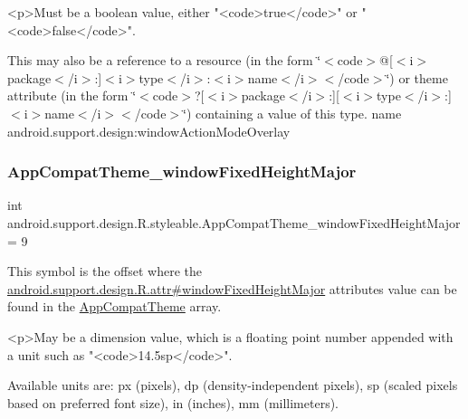 \begin{DoxyVerb}      <p>Must be a boolean value, either "<code>true</code>" or "<code>false</code>".
\end{DoxyVerb}
 

This may also be a reference to a resource (in the form \char`\"{}$<$code$>$@\mbox{[}$<$i$>$package$<$/i$>$\+:\mbox{]}$<$i$>$type$<$/i$>$\+:$<$i$>$name$<$/i$>$$<$/code$>$\char`\"{}) or theme attribute (in the form \char`\"{}$<$code$>$?\mbox{[}$<$i$>$package$<$/i$>$\+:\mbox{]}\mbox{[}$<$i$>$type$<$/i$>$\+:\mbox{]}$<$i$>$name$<$/i$>$$<$/code$>$\char`\"{}) containing a value of this type.  name android.\+support.\+design\+:window\+Action\+Mode\+Overlay \mbox{\label{classandroid_1_1support_1_1design_1_1R_1_1styleable_adda8a0798f30bcf0b35dc5ca9c4e570a}} 
\subsubsection{\texorpdfstring{App\+Compat\+Theme\+\_\+window\+Fixed\+Height\+Major}{AppCompatTheme\_windowFixedHeightMajor}}
{\footnotesize\ttfamily int android.\+support.\+design.\+R.\+styleable.\+App\+Compat\+Theme\+\_\+window\+Fixed\+Height\+Major = 9\hspace{0.3cm}{\ttfamily [static]}}

This symbol is the offset where the \hyperlink{classandroid_1_1support_1_1design_1_1R_1_1attr_a7f3cc481bef4ffdd7d3986407ba955d9}{android.\+support.\+design.\+R.\+attr\#window\+Fixed\+Height\+Major} attribute\textquotesingle{}s value can be found in the \hyperlink{classandroid_1_1support_1_1design_1_1R_1_1styleable_afb351dc8de20cbd4c89abe360373010c}{App\+Compat\+Theme} array.

\begin{DoxyVerb}      <p>May be a dimension value, which is a floating point number appended with a unit such as "<code>14.5sp</code>".
\end{DoxyVerb}
 Available units are\+: px (pixels), dp (density-\/independent pixels), sp (scaled pixels based on preferred font size), in (inches), mm (millimeters). 

